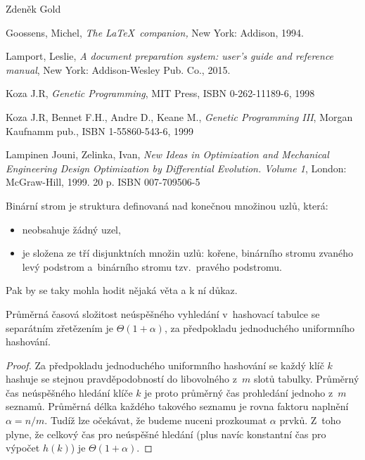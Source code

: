 \documentclass[bc,male,java,dept460]{diploma}		%
\begin{document}
\bigskip
\begin{flushright}
Zdeněk Gold
\end{flushright}

\begin{thebibliography}{99}

 Goossens, Michel,
\textit{The \LaTeX\ companion,} New York: Addison, 1994.

 Lamport, Leslie,
\textit{A document preparation system: user's guide and reference manual},
New York: Addison-Wesley Pub. Co., 2015.

 Koza J.R, 
\textit{Genetic Programming},
MIT Press, ISBN 0-262-11189-6, 1998

 Koza J.R, Bennet F.H., Andre D., Keane M.,
\textit{Genetic Programming III},
Morgan Kaufnamm pub., ISBN 1-55860-543-6, 1999

 Lampinen Jouni, Zelinka, Ivan,
\textit{New Ideas in Optimization and Mechanical Engineering Design Optimization by Differential Evolution. Volume 1},
London: McGraw-Hill, 1999. 20 p. ISBN 007-709506-5

\end{thebibliography}




\begin{definition}
\label{def:BinVyhlStrom}
Binární strom je struktura definovaná nad konečnou množinou uzlů, která:
\begin{itemize}
\item neobsahuje žádný uzel,
\item je složena ze tří disjunktních množin uzlů:
      kořene, binárního stromu zvaného levý podstrom a~binárního stromu tzv.\ pravého podstromu.
\end{itemize}
\end{definition}

Pak by se taky mohla hodit nějaká věta a k ní důkaz.

\begin{theorem}
\label{VetaNeuspechSepar}
Průměrná časová složitost neúspěšného vyhledání  v~hashovací tabulce se  separátním zřetězením je $\Theta(1+\alpha)$, za předpokladu jednoduchého uniformního hashování.
\end{theorem}
\begin{proof}
Za předpokladu jednoduchého uniformního hashování se každý  klíč
$k$ hashuje se stejnou pravděpodobností do libovolného z~$m$ slotů
tabulky. Průměrný čas neúspěšného hledání klíče $k$ je proto
průměrný čas prohledání jednoho z~$m$ seznamů. Průměrná délka
každého takového seznamu je rovna faktoru naplnění $\alpha=n/m$.
Tudíž lze očekávat, že budeme nuceni prozkoumat $\alpha$ prvků.
Z~toho plyne, že celkový čas pro neúspěšné hledání (plus navíc
konstantní čas pro výpočet $h(k)$) je $\Theta(1+\alpha)$.
\end{proof}
\end{document}
